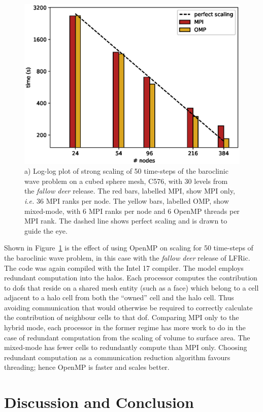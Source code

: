 \documentclass[review,times]{elsarticle}
\begin{document}
\begin{figure}
  \begin{center}
\includegraphics[width=0.75\linewidth]{Fig8a_strong_scale.eps}
    \caption{\label{fig:OMP_scale}a) Log-log plot of strong scaling of
      50 time-steps of the baroclinic wave problem on a cubed sphere
      mesh, C576, with 30 levels from the {\em fallow deer}
      release. The red bars, labelled MPI, show MPI only, {\em i.e.}
      36 MPI ranks per node. The yellow bars, labelled OMP, show
      mixed-mode, with 6 MPI ranks per node and 6 OpenMP threads per
      MPI rank. The dashed line shows perfect scaling and is drawn to
      guide the eye.} 
  \end{center}
\end{figure}

Shown in Figure~\ref{fig:OMP_scale} is the effect of using OpenMP on 
scaling for 50 time-steps of the baroclinic wave problem, in this case
with the {\em fallow deer} release of LFRic. The code was
again compiled with the Intel 17 compiler. The model employs redundant
computation into the halos. Each processor computes the contribution
to dofs that reside on a shared mesh
entity (such as a face) which belong to a cell adjacent to a halo cell
from both the ``owned'' cell and the halo cell. Thus avoiding
communication that would otherwise be required to correctly calculate
the contribution of neighbour cells to that dof. Comparing MPI only to
the hybrid mode, each processor in the former regime has more work to
do in the case of redundant computation from the scaling of volume to
surface area. The mixed-mode has fewer cells to redundantly compute than
MPI only. Choosing redundant computation as a communication reduction
algorithm favours threading; hence OpenMP is faster and scales better.
 

\section{\label{sec:con}Discussion and Conclusion}
\end{document}
